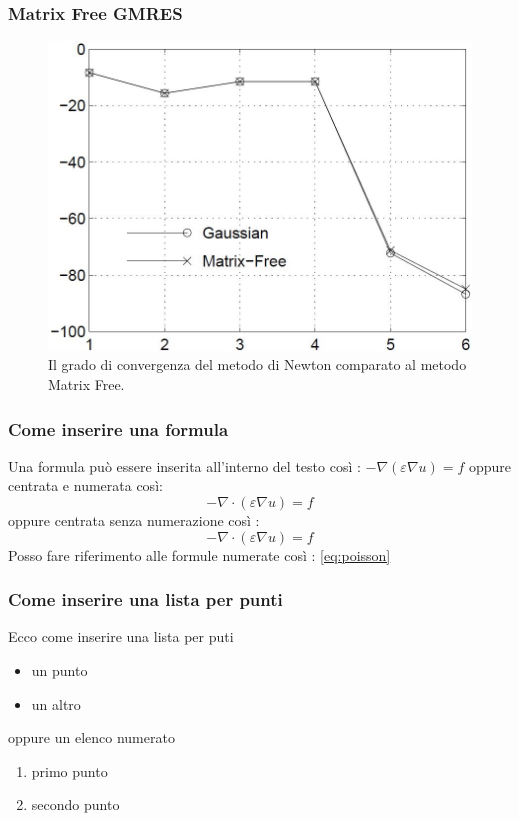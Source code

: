 \documentclass[10pt]{beamer}
\begin{document}
\begin{frame} \frametitle{Matrix Free GMRES}
\begin{figure}
    \centering
    \includegraphics[width=.75\linewidth]{Figura2.JPG}
    \caption{Il grado di convergenza del metodo di Newton comparato al metodo Matrix Free.}
\end{figure}
\end{frame}


\begin{frame} \frametitle{Come inserire una formula}
Una formula può essere inserita all'interno del testo così : 
$-\nabla \left( \varepsilon \nabla u \right) = f $ oppure 
centrata e numerata così:
\begin{equation}\label{eq:poisson}
    -\nabla \cdot \left( \varepsilon \nabla u \right) = f
\end{equation}
oppure centrata senza numerazione così :
$$
 -\nabla \cdot \left( \varepsilon \nabla u \right) = f
$$
Posso fare riferimento alle formule numerate così : \eqref{eq:poisson}
\end{frame}

\begin{frame} \frametitle{Come inserire una lista per punti}
Ecco come inserire una lista per puti
\begin{itemize}
    \item un punto
    \item un altro
\end{itemize}
oppure un elenco numerato
\begin{enumerate}
    \item primo punto
    \item secondo punto
\end{enumerate}

\end{frame}
\end{document}
